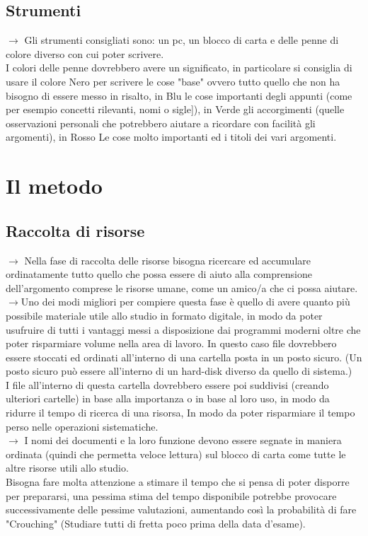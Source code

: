 \documentclass[11pt,a4paper]{article}
\begin{document}
\subsection{Strumenti}
$\rightarrow$ Gli strumenti consigliati sono: un pc, un blocco di carta e delle penne di colore diverso con cui poter scrivere.\\
 I colori delle penne dovrebbero avere un significato, in particolare si consiglia di usare il colore Nero per scrivere le cose "base" ovvero tutto quello che non ha bisogno di essere messo in risalto, in Blu le cose importanti degli appunti (come per esempio concetti rilevanti, nomi o sigle]), in Verde gli accorgimenti (quelle osservazioni personali che potrebbero aiutare a ricordare con facilità gli argomenti), in Rosso Le cose molto importanti ed i titoli dei vari argomenti.\\
\newline

\section{Il metodo}
\subsection{Raccolta di risorse}
$\rightarrow$ Nella fase di raccolta delle risorse bisogna ricercare ed accumulare ordinatamente tutto quello che possa essere di aiuto alla comprensione dell'argomento comprese le risorse umane, come un amico/a che ci possa aiutare.\\
$\rightarrow$Uno dei modi migliori per compiere questa fase è quello di avere quanto più possibile materiale utile allo studio in formato digitale, in modo da poter usufruire di tutti i vantaggi messi a disposizione dai programmi moderni oltre che poter risparmiare volume nella area di lavoro. In questo caso file dovrebbero essere stoccati ed ordinati all'interno di una cartella posta in un posto sicuro. (Un posto sicuro può essere all'interno di un hard-disk diverso da quello di sistema.)\\
I file all'interno di questa cartella dovrebbero essere poi suddivisi (creando ulteriori cartelle) in base alla importanza o in base al loro uso, in modo da ridurre il tempo di ricerca di una risorsa, In modo da poter risparmiare il tempo perso nelle operazioni sistematiche.\\ 
$\rightarrow$ I nomi dei documenti e la loro funzione devono essere segnate in maniera ordinata (quindi che permetta veloce lettura) sul blocco di carta come tutte le altre risorse utili allo studio.\\
 Bisogna fare molta attenzione a stimare il tempo che si pensa di poter disporre per prepararsi, una pessima stima del tempo disponibile potrebbe provocare successivamente delle pessime valutazioni, aumentando così la probabilità di fare "Crouching" (Studiare tutti di fretta poco prima della data d'esame).\\
\end{document}
